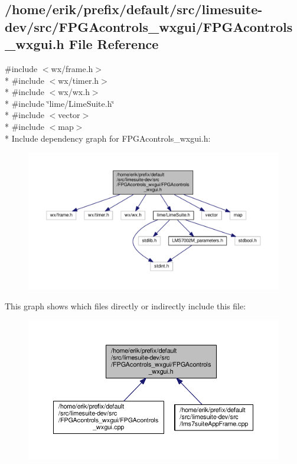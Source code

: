 \subsection{/home/erik/prefix/default/src/limesuite-\/dev/src/\+F\+P\+G\+Acontrols\+\_\+wxgui/\+F\+P\+G\+Acontrols\+\_\+wxgui.h File Reference}
\label{FPGAcontrols__wxgui_8h}
{\ttfamily \#include $<$wx/frame.\+h$>$}\\*
{\ttfamily \#include $<$wx/timer.\+h$>$}\\*
{\ttfamily \#include $<$wx/wx.\+h$>$}\\*
{\ttfamily \#include \char`\"{}lime/\+Lime\+Suite.\+h\char`\"{}}\\*
{\ttfamily \#include $<$vector$>$}\\*
{\ttfamily \#include $<$map$>$}\\*
Include dependency graph for F\+P\+G\+Acontrols\+\_\+wxgui.\+h\+:
\nopagebreak
\begin{figure}[H]
\begin{center}
\leavevmode
\includegraphics[width=350pt]{df/de3/FPGAcontrols__wxgui_8h__incl}
\end{center}
\end{figure}
This graph shows which files directly or indirectly include this file\+:
\nopagebreak
\begin{figure}[H]
\begin{center}
\leavevmode
\includegraphics[width=350pt]{d6/de6/FPGAcontrols__wxgui_8h__dep__incl}
\end{center}
\end{figure}
